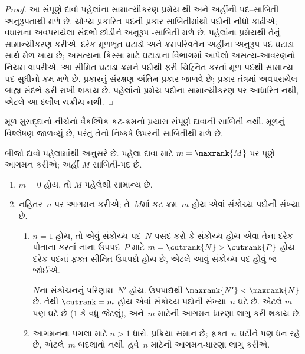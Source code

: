 \documentclass[../../../include/open-logic-section]{subfiles}
\begin{document}
\begin{proof}
આ સંપૂર્ણ દાવો પહેલાંના સામાન્યીકરણ પ્રમેય
થી અને
અહીંની પદ--સાબિતી અનુરૂપતાથી મળે છે.
યોગ્ય પ્રકારિત પદની પ્રકાર-સાબિતીમાંથી પદોની
નોંધો કાઢીએ; વધારાના અવપરાયેલા સંદર્ભો છોડીને
અનુરૂપ -સાબિતી મળે છે. પહેલાંના પ્રમેયથી
તેનું સામાન્યીકરણ કરીએ. દરેક મૂળભૂત ઘટાડો અને
ક્રમપરિવર્તન અહીંના અનુરૂપ પદ-ઘટાડા સાથે મેળ ખાય છે;
અસત્યના કિસ્સા માટે ઘટાડાના વિભાગમાં આપેલો
અસત્ય-આવરણનો નિયમ વાપરીએ. આ સીમિત ઘટાડા-ક્રમને
પદોથી ફરી ચિહ્નિત કરતાં મૂળ પદથી સામાન્ય પદ સુધીનો
ક્રમ મળે છે. પ્રકારનું સંરક્ષણ અંતિમ પ્રકાર જાળવે છે;
પ્રકાર-તંત્રમાં અવપરાયેલ બાહ્ય સંદર્ભ ફરી રાખી શકાય છે.
પહેલાંનો પ્રમેય પદોના સામાન્યીકરણ પર આધારિત નથી,
એટલે આ દલીલ ચક્રીય નથી.
\end{proof}

\begin{editorial}
મૂળ મુસદ્દાનો નીચેનો વૈકલ્પિક કટ-ક્રમનો પ્રયાસ
સંપૂર્ણ દાવાની સાબિતી નથી. મૂળનું વિશ્લેષણ
જાળવ્યું છે, પરંતુ તેનો નિષ્કર્ષ ઉપરની સાબિતીથી મળે છે.

  બીજો દાવો પહેલામાંથી અનુસરે છે. પહેલા દાવા માટે
  $m=\maxrank{M}$ પર પૂર્ણ આગમન કરીએ; અહીં $M$
  સાબિતી-પદ છે.
  \begin{enumerate}

  \item $m=0$ હોય, તો $M$ પહેલેથી સામાન્ય છે.
  \item
    નહિતર~$n$ પર આગમન કરીએ; તે~$M$માં
    કટ-ક્રમ~$m$ હોય એવાં સંકોચ્ય પદોની સંખ્યા છે.
    \begin{enumerate}
    \item $n=1$ હોય, તો એવું સંકોચ્ય પદ~$N$ પસંદ કરો
      કે સંકોચ્ય હોય એવા તેના દરેક પોતાના કરતાં
      નાના ઉપપદ~$P$ માટે $m = \cutrank{N} > \cutrank{P}$
      હોય. દરેક પદનાં ફક્ત સીમિત ઉપપદો હોય છે,
      એટલે આવું સંકોચ્ય પદ હોવું જ જોઈએ.

      $N$ના સંકોચનનું પરિણામ~$N'$ હોય.
      ઉપપાદ્યથી $\maxrank{N'} < \maxrank{N}$ છે.
      તેથી $\cutrank=m$ હોય એવાં સંકોચ્ય પદોની
      સંખ્યા~$n$ ઘટે છે. એટલે $m$ પણ ઘટે છે
      ($1$ કે વધુ જેટલું), અને~$m$ માટેની
      આગમન-ધારણા લાગુ કરી શકાય છે.
    \item આગમનના પગલા માટે $n>1$ ધારો.
      પ્રક્રિયા સમાન છે; ફક્ત~$n$ ઘટીને પણ ધન
      રહે છે, એટલે~$m$ બદલાતો નથી.
      હવે~$n$ માટેની આગમન-ધારણા લાગુ કરીએ.
    \end{enumerate}
\end{enumerate}


\end{editorial}
\end{document}

